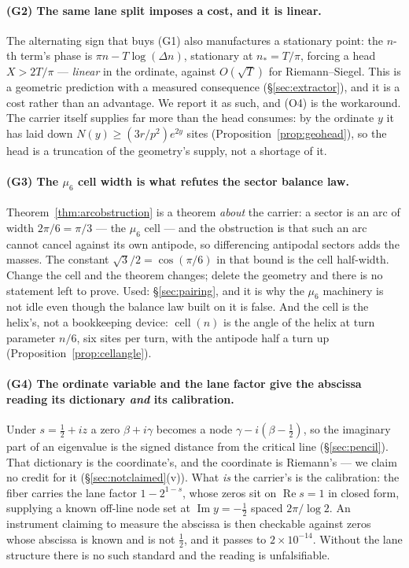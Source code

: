 \documentclass[11pt]{article}
\theoremstyle{plain}
\theoremstyle{definition}
\theoremstyle{remark}
\begin{document}
\paragraph{(G2) The same lane split imposes a cost, and it is linear.}
The alternating sign that buys (G1) also manufactures a stationary point: the $n$-th
term's phase is $\pi n-T\log(\Delta n)$, stationary at $n_\ast=T/\pi$, forcing a head
$X>2T/\pi$ --- \emph{linear} in the ordinate, against $O(\sqrt T)$ for Riemann--Siegel.
This is a geometric prediction with a measured consequence
(\S\ref{sec:extractor}), and it is a cost rather than an advantage. We report it as such,
and (O4) is the workaround. The carrier itself supplies far more than the head consumes:
by the ordinate $y$ it has laid down $N(y)\ge(3r/p^{2})e^{2y}$ sites
(Proposition~\ref{prop:geohead}), so the head is a truncation of the geometry's supply,
not a shortage of it.

\paragraph{(G3) The $\mu_6$ cell width is what refutes the sector balance law.}
Theorem~\ref{thm:arcobstruction} is a theorem \emph{about} the carrier: a sector is an
arc of width $2\pi/6=\pi/3$ --- the $\mu_6$ cell --- and the obstruction is that such an
arc cannot cancel against its own antipode, so differencing antipodal sectors adds the
masses. The constant $\sqrt3/2=\cos(\pi/6)$ in that bound is the cell half-width. Change
the cell and the theorem changes; delete the geometry and there is no statement left to
prove. Used: \S\ref{sec:pairing}, and it is why the $\mu_6$ machinery is not idle even
though the balance law built on it is false. And the cell is the helix's, not a
bookkeeping device: $\operatorname{cell}(n)$ is the angle of the helix at turn parameter
$n/6$, six sites per turn, with the antipode half a turn up
(Proposition~\ref{prop:cellangle}).

\paragraph{(G4) The ordinate variable and the lane factor give the abscissa reading its
dictionary \emph{and} its calibration.}
Under $s=\tfrac12+iz$ a zero $\beta+i\gamma$ becomes a node $\gamma-i(\beta-\tfrac12)$,
so the imaginary part of an eigenvalue is the signed distance from the critical line
(\S\ref{sec:pencil}). That dictionary is the coordinate's, and the coordinate is
Riemann's --- we claim no credit for it (\S\ref{sec:notclaimed}(v)). What \emph{is} the
carrier's is the calibration: the fiber carries the lane factor $1-2^{1-s}$, whose zeros
sit on $\operatorname{Re}s=1$ in closed form, supplying a known off-line node set at
$\operatorname{Im}y=-\tfrac12$ spaced $2\pi/\log2$. An instrument claiming to measure the
abscissa is then checkable against zeros whose abscissa is known and is not $\tfrac12$,
and it passes to $2\times10^{-14}$. Without the lane structure there is no such standard
and the reading is unfalsifiable.
\end{document}

